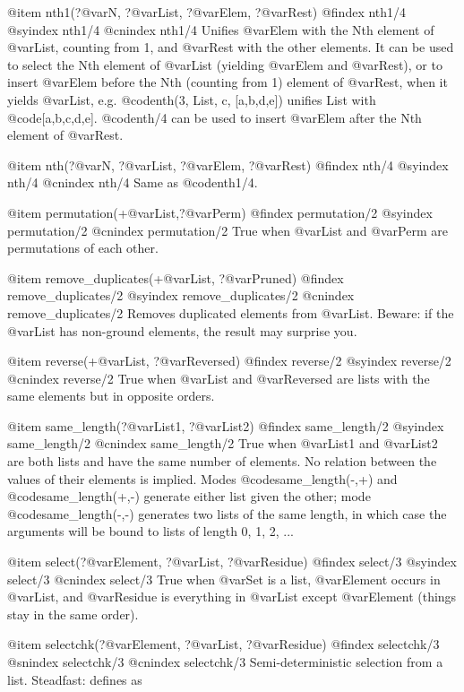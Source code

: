 {{{{{{{{{@item nth1(?@var{N}, ?@var{List}, ?@var{Elem}, ?@var{Rest})
@findex nth1/4
@syindex nth1/4
@cnindex nth1/4
Unifies @var{Elem} with the Nth element of @var{List}, counting from 1,
and @var{Rest} with the other elements.  It can be used to select the
Nth element of @var{List} (yielding @var{Elem} and @var{Rest}), or to
insert @var{Elem} before the Nth (counting from 1) element of
@var{Rest}, when it yields @var{List}, e.g. @code{nth(3, List, c,
[a,b,d,e])} unifies List with @code{[a,b,c,d,e]}.  @code{nth/4}
can be used to insert @var{Elem} after the Nth element of @var{Rest}.

@item nth(?@var{N}, ?@var{List}, ?@var{Elem}, ?@var{Rest})
@findex nth/4
@syindex nth/4
@cnindex nth/4
Same as @code{nth1/4}.

@item permutation(+@var{List},?@var{Perm})
@findex permutation/2
@syindex permutation/2
@cnindex permutation/2
True when @var{List} and @var{Perm} are permutations of each other.

@item remove_duplicates(+@var{List}, ?@var{Pruned})
@findex remove_duplicates/2
@syindex remove_duplicates/2
@cnindex remove_duplicates/2
Removes duplicated elements from @var{List}.  Beware: if the @var{List} has
non-ground elements, the result may surprise you.

@item reverse(+@var{List}, ?@var{Reversed})
@findex reverse/2
@syindex reverse/2
@cnindex reverse/2
True when @var{List} and @var{Reversed} are lists with the same elements
but in opposite orders. 
 
@item same_length(?@var{List1}, ?@var{List2})
@findex same_length/2
@syindex same_length/2
@cnindex same_length/2
True when @var{List1} and @var{List2} are both lists and have the same number
of elements.  No relation between the values of their elements is
implied.
Modes @code{same_length(-,+)} and @code{same_length(+,-)} generate either list given
the other; mode @code{same_length(-,-)} generates two lists of the same length,
in which case the arguments will be bound to lists of length 0, 1, 2, ...

@item select(?@var{Element}, ?@var{List}, ?@var{Residue})
@findex select/3
@syindex select/3
@cnindex select/3
True when @var{Set} is a list, @var{Element} occurs in @var{List}, and
@var{Residue} is everything in @var{List} except @var{Element} (things
stay in the same order).
 
@item selectchk(?@var{Element}, ?@var{List}, ?@var{Residue})
@findex selectchk/3
@snindex selectchk/3
@cnindex selectchk/3
Semi-deterministic selection from a list. Steadfast: defines as

}}}}}}}}}
